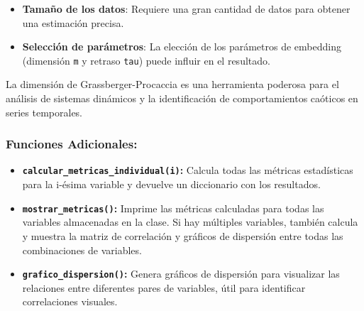 \documentclass[11pt]{article}
\providecommand{\tightlist}{%
      \setlength{\itemsep}{0pt}\setlength{\parskip}{0pt}}
\begin{document}
\begin{itemize}
\tightlist
\item
  \textbf{Tamaño de los datos}: Requiere una gran cantidad de datos para
  obtener una estimación precisa.
\item
  \textbf{Selección de parámetros}: La elección de los parámetros de
  embedding (dimensión \texttt{m} y retraso \texttt{tau}) puede influir
  en el resultado.
\end{itemize}

La dimensión de Grassberger-Procaccia es una herramienta poderosa para
el análisis de sistemas dinámicos y la identificación de comportamientos
caóticos en series temporales.

    \hypertarget{funciones-adicionales}{%
\subsubsection{Funciones Adicionales:}\label{funciones-adicionales}}

\begin{itemize}
\tightlist
\item
  \textbf{\texttt{calcular\_metricas\_individual(i)}:} Calcula todas las
  métricas estadísticas para la i-ésima variable y devuelve un
  diccionario con los resultados.
\item
  \textbf{\texttt{mostrar\_metricas()}:} Imprime las métricas calculadas
  para todas las variables almacenadas en la clase. Si hay múltiples
  variables, también calcula y muestra la matriz de correlación y
  gráficos de dispersión entre todas las combinaciones de variables.
\item
  \textbf{\texttt{grafico\_dispersion()}:} Genera gráficos de dispersión
  para visualizar las relaciones entre diferentes pares de variables,
  útil para identificar correlaciones visuales.
\end{itemize}
\end{document}
